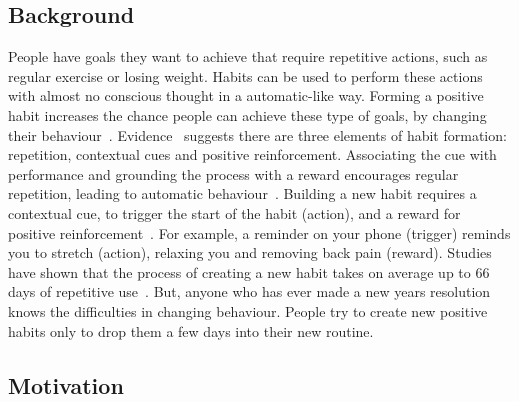 \subsection*{Background}
People have goals they want to achieve that require repetitive actions, such as regular exercise or losing weight.
Habits can be used to perform these actions with almost no conscious thought in a automatic-like way.
Forming a positive habit increases the chance people can achieve these type of goals, by changing their behaviour~\cite{article_promoting_habit_formation}.
Evidence~\cite{article_beyond_self_tracking_designing_apps} suggests there are three elements of habit formation: repetition, contextual cues and positive reinforcement.
Associating the cue with performance and grounding the process with a reward encourages regular repetition, leading to automatic behaviour~\cite{article_experiences_of_habit_formation}.
Building a new habit requires a contextual cue, to trigger the start of the habit (action), and a reward for
positive reinforcement~\cite{article_beyond_self_tracking_designing_apps, article_how_habits_formed_modelling_habit_formation}.
For example, a reminder on your phone (trigger) reminds you to stretch (action), relaxing you and removing back pain (reward).
Studies have shown that the process of creating a new habit takes on average up to 66 days of repetitive use~\cite{article_how_habits_formed_modelling_habit_formation}.
But, anyone who has ever made a new years resolution knows the difficulties in changing behaviour. People try to create new positive habits only to drop them a few days into their new routine.

\subsection*{Motivation}


